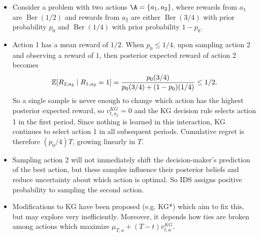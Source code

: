 \documentclass[11pt, openany]{book}
\DeclareMathOperator{\Ber}{Ber}
\begin{document}
\begin{example}
    \vspace*{-20pt}
    \begin{itemize}
        \item Consider a problem with two actions $\A=\set{a_1,a_2}$, where rewards from $a_1$ are $\Ber(1/2)$ and rewards from $a_2$ are either $\Ber(3/4)$ with prior probability $p_0$ and $\Ber(1/4)$ with prior probability $1-p_0$.
        \item Action 1 has a mean reward of $1/2$. When $p_0\leq 1/4$, upon sampling action 2 and observing a reward of $1$, then posterior expected reward of action 2 becomes
            \[
                \mathbb{E}[R_{2,a_2}\mid R_{1,a_2}=1] = \frac{p_0(3/4)}{p_0(3/4) + (1-p_0)(1/4)} \leq 1/2.
            \]
            So a single sample is never enough to change which action has the highest posterior expected reward, so $v_{t,a_2}^{KG}=0$ and the KG decision rule selects action 1 in the first period. Since nothing is learned in this interaction, KG continues to select action 1 in all subsequent periods. Cumulative regret is therefore $(p_0/4)T$, growing linearly in $T$.
        \item Sampling action 2 will not immediately shift the decision-maker's prediction of the best action, but these samples influence their posterior beliefs and reduce uncertainty about which action is optimal. So IDS assigns positive probability to sampling the second action.
    \end{itemize}
\end{example}

\begin{itemize}
    \item Modifications to KG have been proposed (e.g. KG*) which aim to fix this, but may explore very inefficiently. Moreover, it depends how ties are broken among actions which maximize $\mu_{T,a} + (T-t)v_{t,a}^{KG}$.
\end{itemize}
\end{document}
